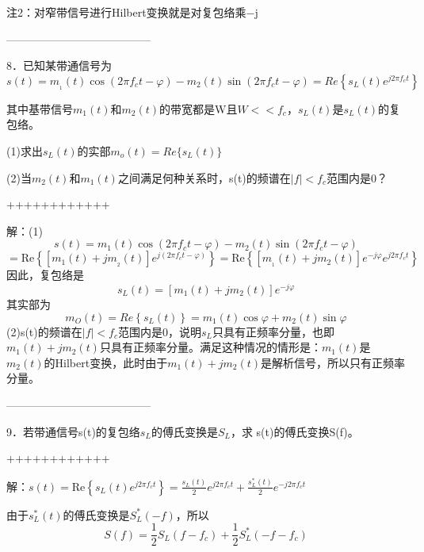 \documentclass[utf8]{article}
\begin{document}
注2：对窄带信号进行Hilbert变换就是对复包络乘−j 

---------------------------------------

8．已知某带通信号为
$$s\left(t \right)=m_{{}_{1}} \left(t \right) \cos \left(2 \pi f_{c}t- \varphi \right)-m_{2} \left(t \right) \sin \left(2 \pi f_{c}t- \varphi \right)=Re \left \{ s_{L} \left(t \right) e^{j2 \pi f_{c}t} \right \}$$

其中基带信号$m_{1}(t)$和$m_{2}(t)$的带宽都是W且$W<<f_{ c}$，$s_{L} \left( t \right)$是$s_{L} \left( t \right)$的复包络。

(1)求出$s_{L}(t)$的实部$m_{o}(t) =Re \{s_{L}(t)\}$

(2)当$m_{2}(t)$和$m_{1}(t)$之间满足何种关系时，s(t)的频谱在$\left| f \right|<f_{c}$范围内是0？ 

++++++++++++

解：(1)
$$s \left( t \right)=m_{1} \left( t \right) \cos \left( 2 \pi f_{c}t- \varphi \right)-m_{2} \left( t \right) \sin \left( 2 \pi f_{c}t- \varphi \right)$$
$$= \mathrm{Re}\left\{\left[\left.m_{1}\left(t\right)+jm_{{}_{2} }\left(t\right)\right.\right]e^{j\left(2\pi f_{c}t-\varphi\right)}\right\}= \mathrm{Re}\left\{\left[\left.m_{{}_{1}}\left(t\right)+jm_{2}\left(t \right)\right.\right]e^{-j\varphi}e^{j2\pi f_{c}t}\right\}$$
因此，复包络是
$$s_{L} \left( t \right)= \left[ m_{1} \left( t \right)+jm_{2} \left( t \right) \right] e^{-j \varphi}$$
其实部为
$$m_{O}\left(t \right)=Re \left \{ s_{L}\left(t \right) \right \}=m_{1} \left( t \right) \cos \varphi+m_{2} \left( t \right) \sin \varphi$$
(2)s(t)的频谱在$\left| f \right|<f_{c}$范围内是0，说明$s_{L}$只具有正频率分量，也即$m_{1} \left( t \right)+jm_{2} \left( t \right)$只具有正频率分量。满足这种情况的情形是：$m_{1} \left( t \right)$是$m_{2} \left( t \right)$的Hilbert变换，此时由于$m_{1} \left( t \right)+jm_{2} \left( t \right)$是解析信号，所以只有正频率分量。 

---------------------------------------

9．若带通信号s(t)的复包络$s_{L}$的傅氏变换是$S_{L}$，求 s(t)的傅氏变换S(f)。

++++++++++++

解：$s\left(t\right) = \mathrm{Re} \left\{s_{L}\left(t\right)e^{j2\pi f_{c} t}\right\} = \frac{s_{L}\left(t\right)}{2}e^{j2\pi f_{c} t}+ \frac{s_{L}^{*}\left(t\right)}{2}e^{-j2\pi f_{c} t}$

由于$s_{L}^{*}\left(t\right)$的傅氏变换是$S_{L}^{*}\left(-f\right)$，所以
$$S \left( f \right)= \frac{1}{2}S_{L} \left( f-f_{c} \right)+ \frac{1}{2}S_{L}^{*} \left(-f-f_{c} \right)$$
\end{document}
